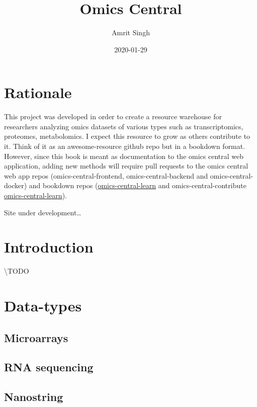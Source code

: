 \documentclass[]{book}
\title{Omics Central}
\author{Amrit Singh}
\date{2020-01-29}
\begin{document}
\maketitle

{
\setcounter{tocdepth}{1}
\tableofcontents
}
\chapter{Rationale}\label{rationale}

This project was developed in order to create a resource warehouse for
researchers analyzing omics datasets of various types such as
transcriptomics, proteomcs, metabolomics. I expect this resource to grow
as others contribute to it. Think of it as an awesome-resource github
repo but in a bookdown format. However, since this book is meant as
documentation to the omics central web application, adding new methods
will require pull requests to the omics central web app repos
(omics-central-frontend, omics-central-backend and omics-central-docker)
and bookdown repos
(\href{https://github.com/singha53/omics-central-learn}{omics-central-learn}
and omics-central-contribute
\href{https://github.com/singha53/omics-central-contribute}{omics-central-learn}).

Site under development\ldots{}

\chapter{Introduction}\label{intro}

\textbackslash{}TODO

\chapter{Data-types}\label{data-types}

\section{Microarrays}\label{microarrays}

\section{RNA sequencing}\label{rna-sequencing}

\section{Nanostring}\label{nanostring}
\end{document}
